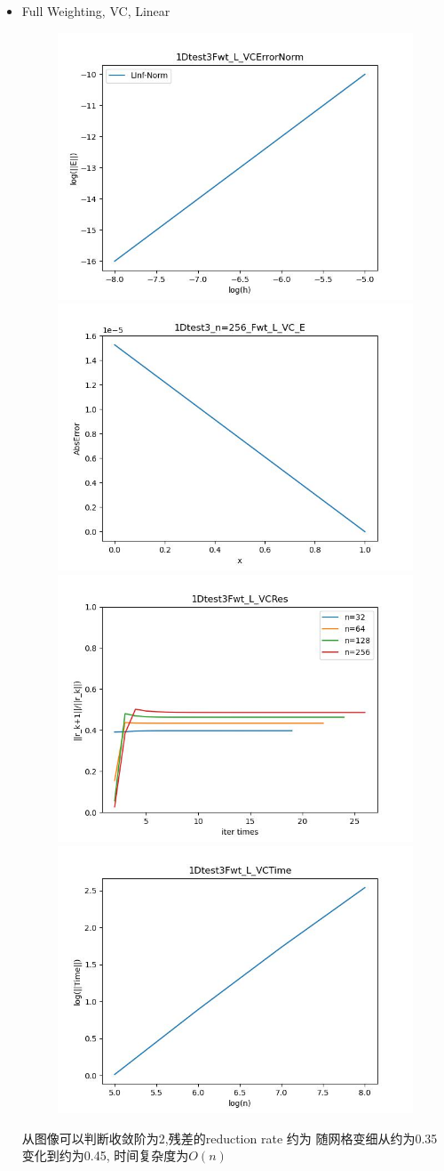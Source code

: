 \documentclass{article}
\begin{document}
\begin{itemize}
    \item Full Weighting, VC, Linear
    \begin{figure}[h]
        \centering
        \includegraphics[width=0.35\linewidth]{1Dtest3Fwt_L_VCErrorNorm.jpg}
        \includegraphics[width=0.35\linewidth]{1Dtest3_n=256_Fwt_L_VC_E.jpg}
        \includegraphics[width=0.35\linewidth]{1Dtest3Fwt_L_VCRes.jpg}
        \includegraphics[width=0.35\linewidth]{1Dtest3Fwt_L_VCTime.jpg}
    \end{figure}
    
    从图像可以判断收敛阶为2,残差的reduction rate 约为 随网格变细从约为0.35变化到约为0.45, 时间复杂度为$O(n)$


\end{itemize}
\end{document}
